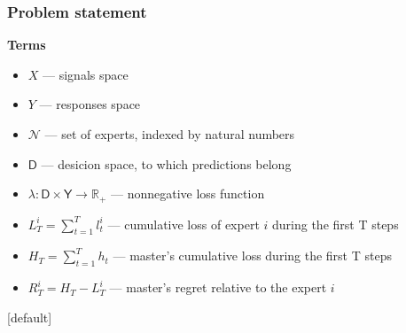 \documentclass{beamer}
\begin{document}
\begin{frame}
\frametitle{Problem statement}

\textbf{Terms}
\begin{itemize}
\item $X$ --- signals space
\item $Y$ --- responses space
\item $\mathcal{N}$ --- set of experts, indexed by natural numbers \\
\item $\mathsf{D}$ --- desicion space, to which predictions belong \\
\item $\lambda: \mathsf{D} \times \mathsf{Y} \rightarrow \mathbb{R}_+$ --- nonnegative loss function \\

\item $L^i_T = \sum\limits_{t = 1}^T l^i_t$ --- cumulative loss of expert $i$ during the first T steps \\
\item $H_T = \sum\limits_{t = 1}^T h_t$ --- master's cumulative loss during the first T steps \\
\item $R^i_T = H_T - L^i_T$ --- master's regret relative to the expert $i$ \\

\end{itemize}


\end{frame}


[default]
\end{document}
